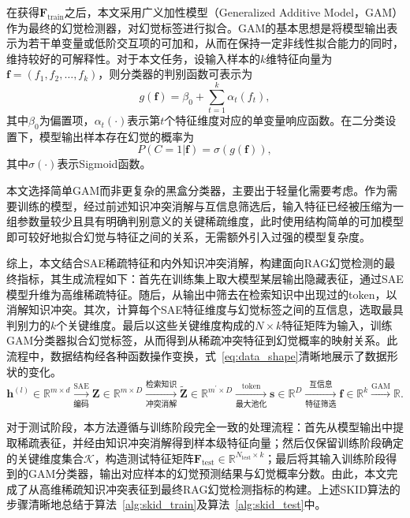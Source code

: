 在获得$\mathbf{F}_{\mathrm{train}}$之后，本文采用广义加性模型（Generalized Additive Model，GAM）作为最终的幻觉检测器，对幻觉标签进行拟合。GAM的基本思想是将模型输出表示为若干单变量或低阶交互项的可加和，从而在保持一定非线性拟合能力的同时，维持较好的可解释性。对于本文任务，设输入样本的$k$维特征向量为$\mathbf{f}=(f_1,f_2,\dots,f_k)$，则分类器的判别函数可表示为
\begin{equation}
g(\mathbf{f})=\beta_0+\sum_{t=1}^{k}\alpha_t(f_t),
\end{equation}
其中$\beta_0$为偏置项，$\alpha_t(\cdot)$表示第$t$个特征维度对应的单变量响应函数。在二分类设置下，模型输出样本存在幻觉的概率为
\begin{equation}
P\left(C=1|\mathbf{f}\right)=\sigma\!\left(g(\mathbf{f})\right),
\end{equation}
其中$\sigma(\cdot)$表示Sigmoid函数。

本文选择简单GAM而非更复杂的黑盒分类器，主要出于轻量化需要考虑。作为需要训练的模型，经过前述知识冲突消解与互信息筛选后，输入特征已经被压缩为一组参数量较少且具有明确判别意义的关键稀疏维度，此时使用结构简单的可加模型即可较好地拟合幻觉与特征之间的关系，无需额外引入过强的模型复杂度。

综上，本文结合SAE稀疏特征和内外知识冲突消解，构建面向RAG幻觉检测的最终指标，其生成流程如下：首先在训练集上取大模型某层输出隐藏表征，通过SAE模型升维为高维稀疏特征。随后，从输出中筛去在检索知识中出现过的token，以消解知识冲突。其次，计算每个SAE特征维度与幻觉标签之间的互信息，选取最具判别力的$k$个关键维度。最后以这些关键维度构成的$N\times k$特征矩阵为输入，训练GAM分类器拟合幻觉标签，从而得到从稀疏冲突特征到幻觉概率的映射关系。此流程中，数据结构经各种函数操作变换，式~\ref{eq:data_shape}清晰地展示了数据形状的变化。
\begin{equation}
  \label{eq:data_shape}
  \mathbf{h}^{(l)}\in\mathbb{R}^{m\times d} \xrightarrow[\text{编码}] {\text{SAE}}
  \mathbf{Z}\in\mathbb{R}^{m\times D} \xrightarrow[\text{冲突消解}]{\text{检索知识}} 
  \widetilde{\mathbf{Z}}\in\mathbb{R}^{m^\prime\times D} \xrightarrow[\text{最大池化}]{\text{token}} 
  \mathbf{s}\in\mathbb{R}^{D} \xrightarrow[\text{特征筛选}]{\text{互信息}} 
  \mathbf{f}\in\mathbb{R}^{k} \xrightarrow{\text{GAM}} 
  \mathbb{R}.
\end{equation}

对于测试阶段，本方法遵循与训练阶段完全一致的处理流程：首先从模型输出中提取稀疏表征，并经由知识冲突消解得到样本级特征向量；然后仅保留训练阶段确定的关键维度集合$\mathcal{K}$，构造测试特征矩阵$\mathbf{F}_{\mathrm{test}}\in\mathbb{R}^{N_{\mathrm{test}}\times k}$；最后将其输入训练阶段得到的GAM分类器，输出对应样本的幻觉预测结果与幻觉概率分数。由此，本文完成了从高维稀疏知识冲突表征到最终RAG幻觉检测指标的构建。上述SKID算法的步骤清晰地总结于算法~\ref{alg:skid_train}及算法~\ref{alg:skid_test}中。

